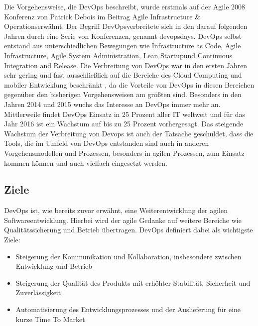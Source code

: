 Die Vorgehensweise, die DevOps beschreibt, wurde erstmals auf der Agile 2008 Konferenz von Patrick Debois im Beitrag \glqq Agile Infrastructure \& Operations\grqq erwähnt. \parencite[Vgl.][]{Debois:2008} Der Begriff \glqq DevOps\grqq verbreitete sich in den darauf folgenden Jahren durch eine Serie von Konferenzen, genannt \glqq devopsdays\grqq.
DevOps selbst entstand aus unterschiedlichen Bewegungen wie \glqq Infrastructure as Code\grqq, \glqq Agile Infrastructure\grqq, \glqq Agile System Administration\grqq, \glqq Lean Startup\grqq und \glqq Continuous Integration and Release\glqq. \parencite[Vgl.][S. 4]{Kim:2015}
Die Verbreitung von DevOps war in den ersten Jahren sehr gering und fast ausschließlich auf die Bereiche des Cloud Computing und mobiler Entwicklung beschränkt \parencite[Vgl.][]{Gartner:2015}, da die Vorteile von DevOps in diesen Bereichen gegenüber den bisherigen Vorgehensweisen am größten sind. Besonders in den Jahren 2014 und 2015 wuchs das Interesse an DevOps immer mehr an. \parencite[Vgl.][S. 7]{DevOpsSODR:2015} Mittlerweile findet DevOps Einsatz in 25 Prozent aller IT weltweit und für das Jahr 2016 ist ein Wachstum auf bis zu 25 Prozent vorhergesagt. \parencite[Vgl.][]{Gartner:2015} Das steigende Wachstum der Verbreitung von Devops ist auch der Tatsache geschuldet, dass die Tools, die im Umfeld von DevOps entstanden sind auch in anderen Vorgehensmodellen und Prozessen, besonders in agilen Prozessen, zum Einsatz kommen können und auch vielfach eingesetzt werden.

\subsection{Ziele}
DevOps ist, wie bereits zuvor erwähnt, eine Weiterentwicklung der agilen Softwareentwicklung. Hierbei wird der agile Gedanke auf weitere Bereiche wie Qualitätssicherung und Betrieb übertragen. DevOps definiert dabei als wichtigste Ziele:

\begin{itemize}
\item Steigerung der Kommunikation und Kollaboration, insbesondere zwischen Entwicklung und Betrieb
\item Steigerung der Qualität des Produkts mit erhöhter Stabilität, Sicherheit und Zuverlässigkeit
\item Automatisierung des Entwicklungsprozesses und der Auslieferung für eine kurze Time To Market
\end{itemize}
\parencite[Vgl.][S. 4]{Kim:2015}

